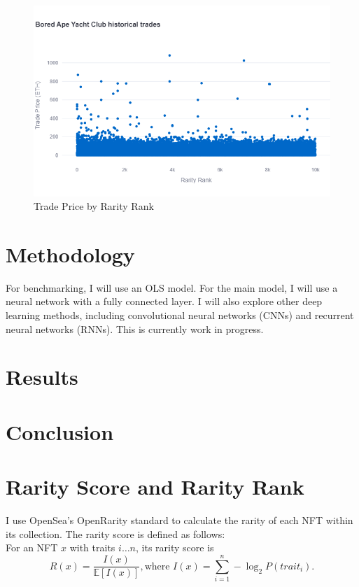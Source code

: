\documentclass[12pt]{article}
\begin{document}
\begin{figure}[H]
    \includegraphics[width=\textwidth]{../figures/price_rarity.png}
    \caption{Trade Price by Rarity Rank}
\end{figure}


\section{Methodology}
\label{sec: method}
For benchmarking, I will use an OLS model. For the main model, I will use a neural network with a fully connected layer. I will also explore other deep learning methods, including convolutional neural networks (CNNs) and recurrent neural networks (RNNs). This is currently work in progress.


\section{Results}
\label{sec: results}


\section{Conclusion}
\label{sec: conclusion}




\newpage
\printbibliography

\newpage
\appendix

\section{Rarity Score and Rarity Rank}
\label{app: rarity}
I use OpenSea's OpenRarity standard to calculate the rarity of each NFT within its collection. The rarity score is defined as follows:\\
For an NFT $x$ with traits $i\dots n$, its rarity score is
\[R(x) = \frac{I(x)}{\mathbb{E}[I(x)]}, \text{where } I(x)=\sum_{i=1}^n -\log_2P(trait_i).\] 
\end{document}
